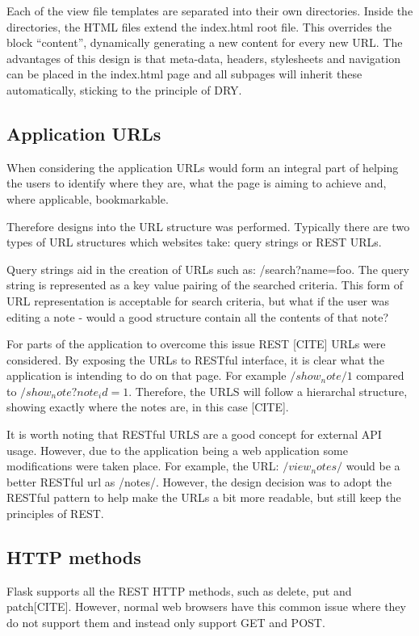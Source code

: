 Each of the view file templates are separated into their own directories. Inside the directories, the HTML files extend the index.html root file. This overrides the block ``content'', dynamically generating a new content for every new URL. The advantages of this design is that meta-data, headers, stylesheets and navigation can be placed in the index.html page and all subpages will inherit these automatically, sticking to the principle of DRY.

\subsection{Application URLs}
When considering the application URLs would form an integral part of helping the users to identify where they are, what the page is aiming to achieve and, where applicable, bookmarkable.

Therefore designs into the URL structure was performed. Typically there are two types of URL structures which websites take: query strings or REST URLs.

Query strings aid in the creation of URLs such as: /search?name=foo. The query string is represented as a key value pairing of the searched criteria. This form of URL representation is acceptable for search criteria, but what if the user was editing a note - would a good structure contain all the contents of that note?

For parts of the application to overcome this issue REST [CITE] URLs were considered. By exposing the URLs to RESTful interface, it is clear what the application is intending to do on that page. For example $/show_note/1$ compared to $/show_note?note_id=1$. Therefore, the URLS will follow a hierarchal structure, showing exactly where the notes are, in this case [CITE].

It is worth noting that RESTful URLS are a good concept for external API usage. However, due to the application being a web application some modifications were taken place. For example, the URL: $/view_notes/$ would be a better RESTful url as /notes/. However, the design decision was to adopt the RESTful pattern to help make the URLs a bit more readable, but still keep the principles of REST.

\subsection{HTTP methods}
Flask supports all the REST HTTP methods, such as delete, put and patch[CITE]. However, normal web browsers have this common issue where they do not support them and instead only support GET and POST.

